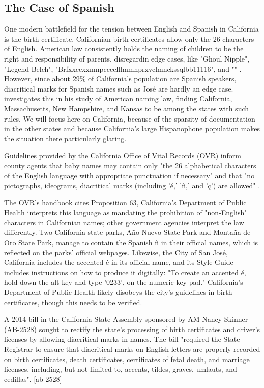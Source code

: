\subsection{The Case of Spanish}

One modern battlefield for the tension between English and Spanish in California
is the birth certificate. Californian birth certificates allow only the 26
characters of English. American law consistently holds the naming of children to
be the right and responsibility of parents, disregardin edge cases, like "Ghoul
Nipple", "Legend Belch", "Brfxxccxxmnpcccclllmmnprxvclmnckssqlbb11116", and ""
\parencite{larson11}. However, since about 29\% of California's population are
Spanish speakers, diacritical marks for Spanish names such as José are hardly an
edge case. \textcite[5]{larson11} investigates this in his study of American
naming law, finding California, Massachusetts, New Hampshire, and Kansas to be
among the states with such rules. We will focus here on California, because of
the sparsity of documentation in the other states and because California's large
Hispanophone population makes the situation there particularly glaring.

\parencite{acs-lang-states} Guidelines provided by the California Office of
Vital Records (OVR) inform county agents that baby names may contain only "the
26 alphabetical characters of the English language with appropriate punctuation
if necessary" and that "no pictographs, ideograms, diacritical marks (including
'é,' 'ñ,' and 'ç') are allowed" \parencite{larson11}.

The OVR's handbook cites Proposition 63, California's Department of Public
Health interprets this language as mandating the prohibition of "non-English"
characters in Californian names; other government agencies interpret the law
differently. Two California state parks, Año Nuevo State Park and Montaña de Oro
State Park, manage to contain the Spanish ñ in their official names, which is
reflected on the parks' official webpages. \parencite{año-nuevo}
\parencite{montaña-de-oro} Likewise, the City of San José, California includes
the accented é in its official name, and its Style Guide includes instructions
on how to produce it digitally: "To create an accented é, hold down the alt key
and type '0233'‚ on the numeric key pad." \textcite{san-josé} California's
Department of Public Health likely disobeys the city's guidelines in birth
certificates, though this needs to be verified.

A 2014 bill in the California State Assembly sponsored by AM Nancy Skinner
(AB-2528) sought to rectify the state's processing of birth certificates and
driver's licenses by allowing diacritical marks in names. The bill "required the
State Registrar to ensure that diacritical marks on English letters are properly
recorded on birth certificates, death certificates, certificates of fetal death,
and marriage licenses, including, but not limited to, accents, tildes, graves,
umlauts, and cedillas". [ab-2528]


